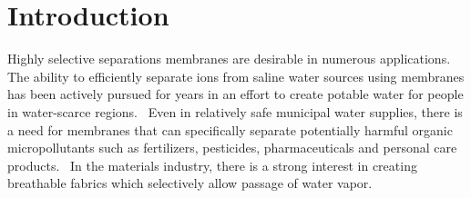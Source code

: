 \documentclass{article}
\begin{document}
  \section{Introduction}

  
  Highly selective separations membranes are desirable in numerous applications. 
  The ability to efficiently separate ions from saline water sources using membranes 
  has been actively pursued for years in an effort to create potable water for people 
  in water-scarce regions.~\cite{werber_materials_2016} Even in relatively safe
  municipal water supplies, there is a need for membranes that can specifically separate
  potentially harmful organic micropollutants such as fertilizers, pesticides, pharmaceuticals
  and personal care products.~\cite{barbosa_occurrence_2016} In the materials industry,
  there is a strong interest in creating breathable fabrics %
  which selectively allow passage of water vapor.~\cite{mondloch_destruction_2015}
\end{document}

